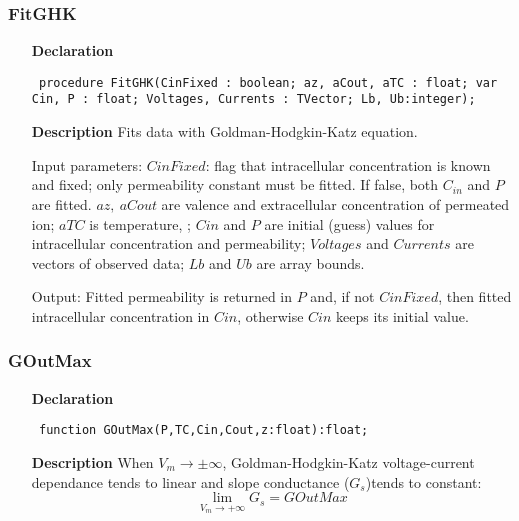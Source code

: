 \documentclass[12pt,a4paper,oneside]{report}
\newcommand{\declarationitem}[1]{\textbf{#1}}
\newcommand{\descriptiontitle}[1]{\textbf{#1}}
\newcommand{\code}[1]{\texttt{#1}}
\begin{document}
\subsubsection{FitGHK}
\label{ugoldman-FitGHK}
\begin{itemize}\item[\declarationitem{Declaration}\hfill]
	\begin{flushleft}
		\code{
			procedure FitGHK(CinFixed : boolean; az, aCout, aTC : float; var Cin, P : float; Voltages, Currents : TVector; Lb, Ub:integer);}
		
	\end{flushleft}
	
	\par
	\item[\descriptiontitle{Description}]
	Fits data with Goldman-Hodgkin-Katz equation. 
	
	Input parameters: $CinFixed$: flag that intracellular concentration is known and fixed; only permeability constant must be fitted. If false, both $C_{in}$ and $P$ are fitted. $az,\ aCout $ are valence and extracellular concentration of permeated ion; $aTC$ is temperature, \celsius; $Cin$ and $P$ are initial (guess) values for intracellular concentration and permeability; $Voltages$ and $Currents$ are vectors of observed data; $Lb$ and $Ub$ are array bounds.
	
	Output: Fitted permeability is returned in $P$ and, if not $CinFixed$, then fitted intracellular concentration in $Cin$, otherwise $Cin$ keeps its initial value.  
	
\end{itemize}
\subsubsection{GOutMax}
\label{ugoldman-GOutMax}
\begin{itemize}\item[\declarationitem{Declaration}\hfill]
	\begin{flushleft}
		\code{
			function GOutMax(P,TC,Cin,Cout,z:float):float;}
		
	\end{flushleft}
	
	\item[\descriptiontitle{Description}]
	When $V_m\rightarrow\pm\infty$, Goldman-Hodgkin-Katz voltage-current dependance tends to linear and slope conductance ($G_s$)tends to constant: 
	$$
	\lim_{V_m\rightarrow+\infty}{G_s}=G{OutMax}
	$$
\end{itemize}
\end{document}
